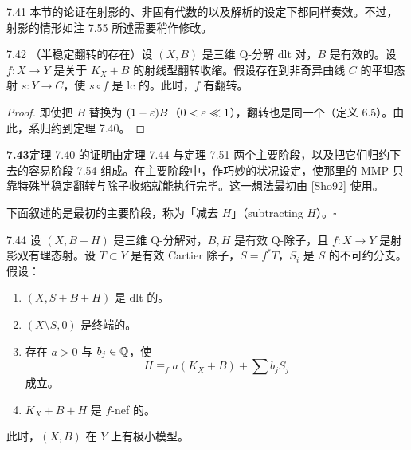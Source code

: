 \begin{remark}{7.41}
本节的论证在射影的、非固有代数的以及解析的设定下都同样奏效。不过，射影的情形如注 7.55 所述需要稍作修改。
\end{remark}

\begin{corollaryp}{7.42}
（半稳定翻转的存在）设 $(X,B)$ 是三维 Q-分解 dlt 对，$B$ 是有效的。设 $f\colon X\to Y$ 是关于 $K_X+B$ 的射线型翻转收缩。假设存在到非奇异曲线 $C$ 的平坦态射 $s\colon Y\to C$，使 $s\circ f$ 是 lc 的。此时，$f$ 有翻转。
\end{corollaryp}

\begin{proof}
即使把 $B$ 替换为 $(1-\varepsilon)B$（$0<\varepsilon\ll1$），翻转也是同一个（定义 6.5）。由此，系归约到定理 7.40。
\end{proof}

\par\medskip\noindent\textbf{7.43}\quad 定理 7.40 的证明由定理 7.44 与定理 7.51 两个主要阶段，以及把它们归约下去的容易阶段 7.54 组成。在主要阶段中，作巧妙的状况设定，使那里的 MMP 只靠特殊半稳定翻转与除子收缩就能执行完毕。这一想法最初由 [Sho92] 使用。

下面叙述的是最初的主要阶段，称为「减去 $H$」（subtracting $H$）。\hfill$\square$

\begin{theoremp}{7.44}
设 $(X,B+H)$ 是三维 Q-分解对，$B,H$ 是有效 Q-除子，且 $f\colon X\to Y$ 是射影双有理态射。设 $T\subset Y$ 是有效 Cartier 除子，$S=f^*T$，$S_i$ 是 $S$ 的不可约分支。假设：
\begin{enumerate}[label=(\arabic*),leftmargin=2.4em,itemsep=1pt,topsep=2pt,parsep=0pt]
\item $(X,S+B+H)$ 是 dlt 的。
\item $(X\setminus S,0)$ 是终端的。
\item 存在 $a>0$ 与 $b_j\in\mathbb{Q}$，使
\[
H\equiv_f a(K_X+B)+\sum b_jS_j
\]
成立。
\item $K_X+B+H$ 是 $f$-nef 的。
\end{enumerate}
此时，$(X,B)$ 在 $Y$ 上有极小模型。
\end{theoremp}

